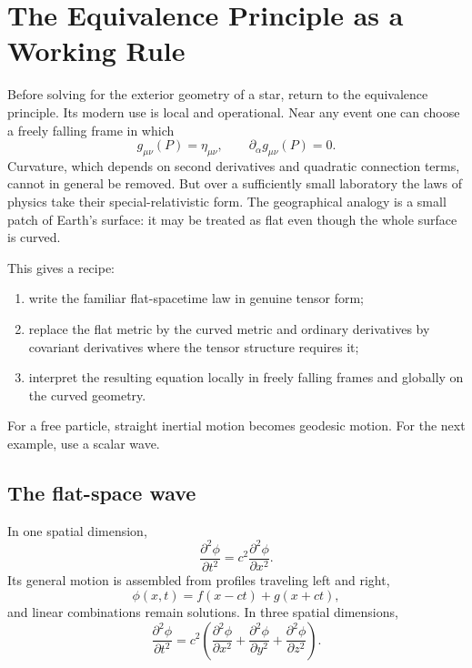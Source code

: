 \section{The Equivalence Principle as a Working Rule}

Before solving for the exterior geometry of a star, return to the
equivalence principle.  Its modern use is local and operational.  Near
any event one can choose a freely falling frame in which
\begin{equation}
  g_{\mu\nu}(P)=\eta_{\mu\nu},
  \qquad
  \partial_\alpha g_{\mu\nu}(P)=0.
  \label{eq:l10-local-inertial}
\end{equation}
Curvature, which depends on second derivatives and quadratic connection
terms, cannot in general be removed.  But over a sufficiently small
laboratory the laws of physics take their special-relativistic form.
The geographical analogy is a small patch of Earth's surface: it may
be treated as flat even though the whole surface is curved.

This gives a recipe:
\begin{enumerate}
\item write the familiar flat-spacetime law in genuine tensor form;
\item replace the flat metric by the curved metric and ordinary
derivatives by covariant derivatives where the tensor structure
requires it;
\item interpret the resulting equation locally in freely falling
frames and globally on the curved geometry.
\end{enumerate}

For a free particle, straight inertial motion becomes geodesic motion.
For the next example, use a scalar wave.

\subsection{The flat-space wave}

In one spatial dimension,
\begin{equation}
  \frac{\partial^2\phi}{\partial t^2}
  =
  c^2\frac{\partial^2\phi}{\partial x^2}.
  \label{eq:l10-wave-1d}
\end{equation}
Its general motion is assembled from profiles traveling left and
right,
\begin{equation}
  \phi(x,t)=f(x-ct)+g(x+ct),
  \label{eq:l10-wave-solutions}
\end{equation}
and linear combinations remain solutions.  In three spatial
dimensions,
\begin{equation}
  \frac{\partial^2\phi}{\partial t^2}
  =
  c^2\left(
  \frac{\partial^2\phi}{\partial x^2}
  +\frac{\partial^2\phi}{\partial y^2}
  +\frac{\partial^2\phi}{\partial z^2}
  \right).
  \label{eq:l10-wave-3d}
\end{equation}

